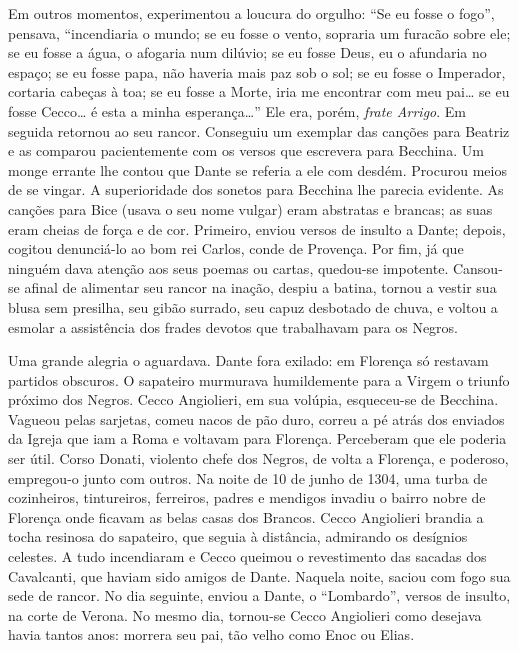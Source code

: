 Em outros momentos, experimentou a loucura do orgulho: “Se eu fosse o fogo'',
pensava, ``incendiaria o mundo; se eu fosse o vento, sopraria um furacão
sobre ele; se eu fosse a água, o afogaria num dilúvio; se eu fosse Deus,
eu o afundaria no espaço; se eu fosse papa, não haveria mais paz sob o
sol; se eu fosse o Imperador, cortaria cabeças à toa; se eu fosse a Morte,
iria me encontrar com meu pai\ldots{} se eu fosse Cecco\ldots{} é esta a minha
esperança\ldots{}” Ele era, porém, \textit{frate Arrigo}. Em seguida retornou
ao seu rancor. Conseguiu um exemplar das canções para Beatriz e as
comparou pacientemente com os versos que escrevera para Becchina. Um monge
errante lhe contou que Dante se referia a ele com desdém. Procurou meios
de se vingar. A superioridade dos sonetos para Becchina lhe parecia
evidente. As canções para Bice (usava o seu nome vulgar) eram abstratas e
brancas; as suas eram cheias de força e de cor. Primeiro, enviou versos de
insulto a Dante; depois, cogitou denunciá-lo ao bom rei Carlos, conde de
Provença. Por fim, já que ninguém dava atenção aos seus poemas ou cartas,
quedou-se impotente. Cansou-se afinal de alimentar seu rancor na inação,
despiu a batina, tornou a vestir sua blusa sem presilha, seu gibão
surrado, seu capuz desbotado de chuva, e voltou a esmolar a assistência
dos frades devotos que trabalhavam para os Negros.

Uma grande alegria o aguardava. Dante fora exilado: em Florença só restavam
partidos obscuros. O sapateiro murmurava humildemente para a Virgem o
triunfo próximo dos Negros. Cecco Angiolieri, em sua volúpia, esqueceu-se
de Becchina. Vagueou pelas sarjetas, comeu nacos de pão duro, correu a pé
atrás dos enviados da Igreja que iam a Roma e voltavam para Florença.
Perceberam que ele poderia ser útil. Corso Donati, violento chefe dos
Negros, de volta a Florença, e poderoso, empregou-o junto com outros. Na
noite de 10 de junho de 1304, uma turba de cozinheiros, tintureiros,
ferreiros, padres e mendigos invadiu o bairro nobre de Florença onde
ficavam as belas casas dos Brancos. Cecco Angiolieri brandia a tocha
resinosa do sapateiro, que seguia à distância, admirando os desígnios
celestes. A tudo incendiaram e Cecco queimou o revestimento das sacadas
dos Cavalcanti, que haviam sido amigos de Dante. Naquela noite, saciou com
fogo sua sede de rancor. No dia seguinte, enviou a Dante, o “Lombardo”,
versos de insulto, na corte de Verona. No mesmo dia, tornou-se Cecco
Angiolieri como desejava havia tantos anos: morrera seu pai, tão velho
como Enoc ou Elias.


